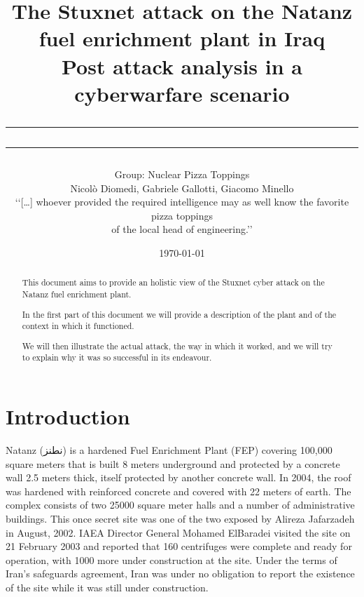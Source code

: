 \documentclass[12pt]{article}
\title{The Stuxnet attack on the Natanz fuel enrichment plant in Iraq\\
\large{Post attack analysis in a cyberwarfare scenario}
\rule[0.1cm]{13cm}{0.1mm}
\rule[0.5cm]{13.5cm}{0.6mm}}
\author{Group: Nuclear Pizza Toppings \\
Nicolò Diomedi, Gabriele Gallotti, Giacomo Minello
\\
\scriptsize‘‘[…] whoever provided the required intelligence may as well know the favorite pizza toppings \\
\scriptsize of the local head of engineering.’’\cite{killcentrifuge}
\\
}
\date{\today}
\date{}
\begin{document}
\begin{titlepage}
\maketitle
\begin{abstract}
\noindent  This document aims to provide an holistic view of the Stuxnet cyber attack on the Natanz fuel enrichment plant.

\noindent In the first part of this document we will provide a description of the plant and of the context in which it functioned.

\noindent We will then illustrate the actual attack, the way in which it worked, and we will try to explain why it was so successful in its endeavour.
\end{abstract}
\end{titlepage}


\tableofcontents

\listoffigures

\newpage

\section{Introduction}
Natanz ({نطنز}) is a hardened Fuel Enrichment Plant (FEP) covering 100,000 square meters that is built 8 meters underground and protected by a concrete wall 2.5 meters thick, itself protected by another concrete wall. In 2004, the roof was hardened with reinforced concrete and covered with 22 meters of earth. The complex consists of two 25000 square meter halls and a number of administrative buildings. This once secret site was one of the two exposed by Alireza Jafarzadeh in August, 2002. IAEA Director General Mohamed ElBaradei visited the site on 21 February 2003 and reported that 160 centrifuges were complete and ready for operation, with 1000 more under construction at the site. Under the terms of Iran’s safeguards agreement, Iran was under no obligation to report the existence of the site while it was still under construction.
\end{document}
